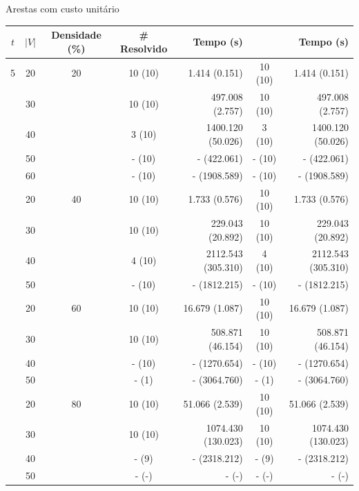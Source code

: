 \documentclass[dvipsnames]{beamer}
\newcommand\Fontvi{\fontsize{5}{6.2}\selectfont}
\begin{document}
\begin{frame}{Arestas com custo unitário}
  \tiny{
    \Fontvi
\begin{table}
\begin{tabular}{|c|c|c|>{\columncolor[rgb]{1,1,0}}c|r|>{\columncolor[rgb]{1,1,0}}c|r|}\hline

{$t$} & {$|V|$} & {Densidade (\%)} & {\# Resolvido } & {Tempo (s)}  &{\# Árvore}  &{Tempo (s)} 
\\ \hline\hline

5 & 20 & 20 & 10 (10) & 1.414 (0.151) & 10 (10) & 1.414 (0.151) \\ 
 & 30 & & 10 (10) & 497.008 (2.757) & 10 (10) & 497.008 (2.757) \\ 
 & 40 & & 3 (10) & 1400.120 (50.026) & 3 (10) & 1400.120 (50.026) \\ 
 & 50 & & - (10) & - (422.061) & - (10) & - (422.061) \\ 
 & 60 & & - (10) & - (1908.589) & - (10) & - (1908.589) \\ 
 & 20 & 40 & 10 (10) & 1.733 (0.576) & 10 (10) & 1.733 (0.576) \\ 
 & 30 & & 10 (10) & 229.043 (20.892) & 10 (10) & 229.043 (20.892) \\ 
 & 40 & & 4 (10) & 2112.543 (305.310) & 4 (10) & 2112.543 (305.310) \\ 
 \rowcolor[rgb]{1,1,0}& 50 & & - (10) & - (1812.215) & - (10) & - (1812.215) \\ 
 & 20 & 60 & 10 (10) & 16.679 (1.087) & 10 (10) & 16.679 (1.087) \\ 
 & 30 & & 10 (10) & 508.871 (46.154) & 10 (10) & 508.871 (46.154) \\ 
 & 40 & & - (10) & - (1270.654) & - (10) & - (1270.654) \\ 
 & 50 & & - (1) & - (3064.760) & - (1) & - (3064.760) \\ 
 & 20 & 80 & 10 (10) & 51.066 (2.539) & 10 (10) & 51.066 (2.539) \\ 
 & 30 & & 10 (10) & 1074.430 (130.023) & 10 (10) & 1074.430 (130.023) \\ 
 & 40 & & - (9) & - (2318.212) & - (9) & - (2318.212) \\ 
 & 50 & & - (-) & - (-) & - (-) & - (-) \\ 

\end{tabular}
\end{table}}
\end{frame}
\end{document}
